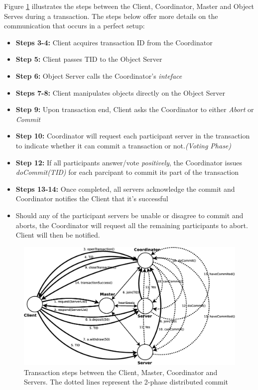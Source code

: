 \documentclass[times, 10pt,twocolumn]{article}
\begin{document}
Figure \ref{fig:transa} illustrates the steps between the Client, Coordinator, Master and Object Serves during a transaction. The steps below offer more details on the communication that occurs in a perfect setup: 

\begin{itemize}[noitemsep, nolistsep]
\item {\bf Steps 3-4:} Client acquires transaction ID from the Coordinator 
\item {\bf Step 5:} Client passes TID to the Object Server
\item {\bf Step 6:} Object Server calls the Coordinator's {\it inteface}
\item {\bf Steps 7-8:} Client manipulates objects directly on the Object Server
\item {\bf Step 9:} Upon transaction end, Client asks the Coordinator to either {\it Abort} or {\it Commit} 
\item {\bf Step 10:} Coordinator will request each participant server in the transaction to indicate whether it can commit a transaction or not.{\it (Voting Phase)}
\item {\bf Step 12:} If all participants answer/vote {\it positively}, the Coordinator issues {\it doCommit(TID)} for each parcipant to commit its part of the transaction
\item {\bf Steps 13-14:} Once completed, all servers acknowledge the commit and Coordinator notifies the Client that it's successful
\item Should any of the participant servers be unable or disagree to commit and aborts, the Coordinator will request all the remaining participants to abort. Client will then be notified.
\end{itemize}

\begin{figure}
\centering
\includegraphics[scale=0.2]{transaction.eps}
\caption{Transaction steps between the Client, Master, Coordinator and Servers. The dotted lines represent the 2-phase distributed commit}
\label{fig:transa}
\end{figure}
\end{document}
